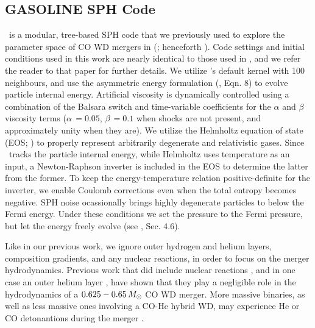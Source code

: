 
\subsection{GASOLINE SPH Code}
\label{ssec:c3_gasoline}

\gasoline\ is a modular, tree-based SPH code that we previously used to explore the parameter space of CO WD mergers in \citeauthor{zhu+13} (\citeyear{zhu+13}; henceforth \citeal{zhu+13}).  Code settings and initial conditions used in this work are nearly identical to those used in \citeal{zhu+13}, and we refer the reader to that paper for further details.  We utilize \gasoline's default \cite{hernk89} kernel with 100 neighbours, and use the asymmetric energy formulation (\citeauthor{wadssq04}, Eqn. 8) to evolve particle internal energy.  Artificial viscosity is dynamically controlled using a combination of the Balsara switch and time-variable coefficients for the $\alpha$ and $\beta$ viscosity terms ($\alpha\,=0.05$, $\beta\,=0.1$ when shocks are not present, and approximately unity when they are).  We utilize the Helmholtz equation of state (EOS; \citealt{timms00}) to properly represent arbitrarily degenerate and relativistic gases.  Since \gasoline\ tracks the particle internal energy, while Helmholtz uses temperature as an input, a Newton-Raphson inverter is included in the EOS to determine the latter from the former.  To keep the energy-temperature relation positive-definite for the inverter, we enable Coulomb corrections even when the total entropy becomes negative.  SPH noise ocassionally brings highly degenerate particles to below the Fermi energy.  Under these conditions we set the pressure to the Fermi pressure, but let the energy freely evolve (see \citealt{zhu+13}, Sec. 4.6).

Like in our previous work, we ignore outer hydrogen and helium layers, composition gradients, and any nuclear reactions, in order to focus on the merger hydrodynamics.  Previous work that did include nuclear reactions \citep{loreig09,dan+12}, and in one case an outer helium layer \citep{rask+12}, have shown that they play a negligible role in the hydrodynamics of a $0.625 - 0.65\,\Msun$ CO WD merger.  More massive binaries, as well as less massive ones involving a CO-He hybrid WD, may experience He or CO detonantions during the merger \citep{pakm+10, rask+12, dan+12}.

